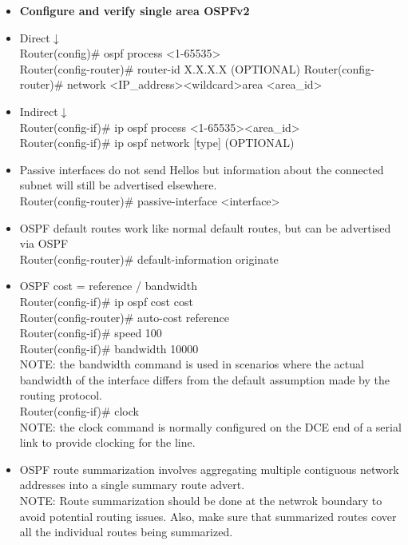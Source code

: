 \documentclass{article}
\begin{document}
\begin{itemize}
  \item \textbf{Configure and verify single area OSPFv2}
  	\item[] Direct$\downarrow$\\
  		Router(config)\# ospf process \textless 1-65535\textgreater\\
  		Router(config-router)\# router-id X.X.X.X (OPTIONAL)
  		Router(config-router)\# network \textless IP\_address\textgreater \textless wildcard\textgreater area \textless area\_id\textgreater
  	\item[] Indirect$\downarrow$\\
  		Router(config-if)\# ip ospf process \textless 1-65535\textgreater \textless area\_id\textgreater\\
  		Router(config-if)\# ip ospf network [type] (OPTIONAL)
  	\item[] Passive interfaces do not send Hellos but information about the connected subnet will still be advertised elsewhere.\\
  		Router(config-router)\# passive-interface \textless interface\textgreater
  	\item[] OSPF default routes work like normal default routes, but can be advertised via OSPF\\
  		Router(config-router)\# default-information originate
  	\item[] OSPF cost = reference / bandwidth\\
  		Router(config-if)\# ip ospf cost cost\\
  		Router(config-router)\# auto-cost reference\\
  		Router(config-if)\# speed 100\\
  		Router(config-if)\# bandwidth 10000\\
  		NOTE: the bandwidth command is used in scenarios where the actual bandwidth of the interface differs from the default assumption made by the routing protocol.\\
  		Router(config-if)\# clock\\
  		NOTE: the clock command is normally configured on the DCE end of a serial link to provide clocking for the line.
  	\item[] OSPF route summarization involves aggregating multiple contiguous network addresses into a single summary route advert.\\
  		NOTE: Route summarization should be done at the netwrok boundary to avoid potential routing issues. Also, make sure that summarized routes cover all the individual routes being summarized.\\

\end{itemize}
\end{document}
